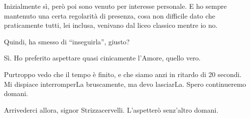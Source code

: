 \documentclass[a4paper,12pt]{article}
\newcommand{\Walter}{\speak{W}}
\newcommand{\Pollazzi}{\speak{P}}
\begin{document}
\begin{dialogue}
\Walter Inizialmente sì, però poi sono venuto per interesse personale. E ho sempre mantenuto una certa regolarità di presenza, cosa non difficile dato che praticamente tutti, lei inclusa, venivano dal liceo classico mentre io no.

\Pollazzi Quindi, ha smesso di “inseguirla”, giusto?

\Walter Sì. Ho preferito aspettare quasi cinicamente l'Amore, quello vero.

\Pollazzi {} Purtroppo vedo che il tempo è finito, e che siamo anzi in ritardo di 20 secondi. Mi dispiace interromperLa bruscamente, ma devo lasciarLa. Spero continueremo domani.

\Walter Arrivederci allora, signor Strizzacervelli. L'aspetterò senz'altro domani.

\end{dialogue}

\pagebreak
\end{document}
